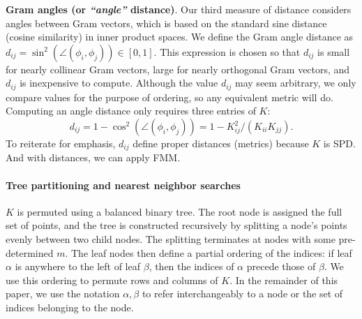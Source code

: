 \textbf{Gram angles (or \emph{``angle''} distance)}.
Our third measure of distance considers angles between Gram vectors, which is based on the standard sine distance (cosine similarity) in inner product spaces. 
We define the Gram angle distance as
$d_{ij} = \sin^2\left(\angle(\phi_i,\phi_j)\right)\in [0, 1]$.
This expression is chosen so that $d_{ij}$ is small for nearly collinear
Gram vectors, large for nearly orthogonal Gram vectors, and $d_{ij}$ is
inexpensive to compute. Although the value $d_{ij}$ may seem arbitrary,
we only compare values for the purpose of ordering,
so any equivalent metric will do.
Computing an angle distance only requires three entries of $K$:
\begin{equation}
  d_{ij} = 1 - \cos^2 \left(\angle(\phi_i,\phi_j)\right)
          = 1 - K_{ij}^2/(K_{ii} K_{jj}).
\end{equation}
To reiterate for emphasis, $d_{ij}$ define proper distances (metrics) because $K$ is SPD. And with distances, we can apply FMM.

\paragraph{Tree partitioning and nearest neighbor searches}
$K$ is permuted using a balanced binary tree.  The root node is assigned the full set of points, and the tree is constructed recursively by splitting a node's points evenly between two child nodes. The splitting terminates at nodes with some pre-determined  $m$. The leaf nodes then define a partial ordering of the indices: if leaf $\alpha$ is anywhere to the left of leaf $\beta$, then the indices of $\alpha$ precede those of $\beta$. We use this ordering to permute rows and columns of $K$. In the remainder of this paper, we use the notation $\alpha, \beta$ to refer interchangeably to a node or the set of indices belonging to the node.

